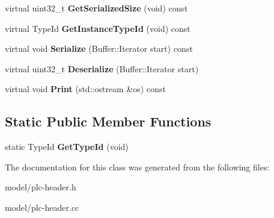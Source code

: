 \begin{DoxyCompactItemize}
\item 
\hypertarget{classns3_1_1PLC__PhyFrameControlHeader_af24503f38014fc950e6c98797b9b941a}{virtual uint32\-\_\-t {\bfseries \-Get\-Serialized\-Size} (void) const }\label{classns3_1_1PLC__PhyFrameControlHeader_af24503f38014fc950e6c98797b9b941a}

\item 
\hypertarget{classns3_1_1PLC__PhyFrameControlHeader_a0745800604726524c26777b3f367a46e}{virtual \-Type\-Id {\bfseries \-Get\-Instance\-Type\-Id} (void) const }\label{classns3_1_1PLC__PhyFrameControlHeader_a0745800604726524c26777b3f367a46e}

\item 
\hypertarget{classns3_1_1PLC__PhyFrameControlHeader_a61c24c4f51ed3b82fe0047f40d53b28e}{virtual void {\bfseries \-Serialize} (\-Buffer\-::\-Iterator start) const }\label{classns3_1_1PLC__PhyFrameControlHeader_a61c24c4f51ed3b82fe0047f40d53b28e}

\item 
\hypertarget{classns3_1_1PLC__PhyFrameControlHeader_aeb3736aba39815d87027826c62c338e5}{virtual uint32\-\_\-t {\bfseries \-Deserialize} (\-Buffer\-::\-Iterator start)}\label{classns3_1_1PLC__PhyFrameControlHeader_aeb3736aba39815d87027826c62c338e5}

\item 
\hypertarget{classns3_1_1PLC__PhyFrameControlHeader_a3c60c1bb7693de3d06b6722fed802215}{virtual void {\bfseries \-Print} (std\-::ostream \&os) const }\label{classns3_1_1PLC__PhyFrameControlHeader_a3c60c1bb7693de3d06b6722fed802215}

\end{DoxyCompactItemize}
\subsection*{\-Static \-Public \-Member \-Functions}
\begin{DoxyCompactItemize}
\item 
\hypertarget{classns3_1_1PLC__PhyFrameControlHeader_a0e2d6a56716b47ea27a1c8774d24b5e1}{static \-Type\-Id {\bfseries \-Get\-Type\-Id} (void)}\label{classns3_1_1PLC__PhyFrameControlHeader_a0e2d6a56716b47ea27a1c8774d24b5e1}

\end{DoxyCompactItemize}


\-The documentation for this class was generated from the following files\-:\begin{DoxyCompactItemize}
\item 
model/plc-\/header.\-h\item 
model/plc-\/header.\-cc\end{DoxyCompactItemize}
